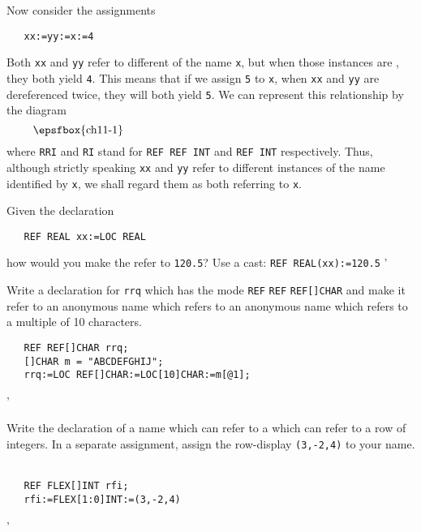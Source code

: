 Now consider the assignments
\begin{verbatim}
   xx:=yy:=x:=4
\end{verbatim}
\noindent
Both \verb|xx| and \verb|yy| refer to different
 of the name \verb|x|, but when those
instances are , they both yield
\verb|4|. This means that if we assign \verb|5| to \verb|x|, when
\verb|xx| and \verb|yy| are dereferenced twice, they will both yield
\verb|5|. We can represent this relationship by the diagram
$$\vbox{\epsfbox{ch11-1}}$$
where \verb|RRI| and \verb|RI| stand for \verb|REF REF INT| and
\verb|REF INT| respectively. Thus, although strictly speaking \verb|xx|
and \verb|yy| refer to different instances of the name identified by
\verb|x|, we shall regard them as both referring to \verb|x|.

\begin{exercise}
\item Given the declaration
\begin{verbatim}
   REF REAL xx:=LOC REAL
\end{verbatim}
\noindent
how would you make the  refer to
\verb|120.5|? \ans Use a cast: \verb|REF REAL(xx):=120.5|
'
\item Write a declaration for \verb|rrq| which has the mode
\verb|REF| \verb|REF| \verb|REF[]CHAR| and make it refer to an
anonymous name which refers to an anonymous name which refers to a
multiple of 10 characters. \ans
\begin{verbatim}
   REF REF[]CHAR rrq;
   []CHAR m = "ABCDEFGHIJ";
   rrq:=LOC REF[]CHAR:=LOC[10]CHAR:=m[@1];
\end{verbatim}
'
\item Write the declaration of a name which can refer to a
 which can refer to a row of integers. In a
separate assignment, assign the row-display \newline
\verb|(3,-2,4)| to your name. \ans \ \newline%
\begin{verbatim}
   REF FLEX[]INT rfi;
   rfi:=FLEX[1:0]INT:=(3,-2,4)
\end{verbatim}
'
\end{exercise}

